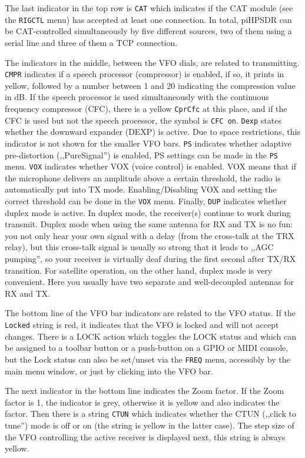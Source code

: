 \documentclass[12pt]{book}
\def\rett#1{\texttt{\color{red}#1}}
\def\bltt#1{\texttt{\color{blue}#1}}
\def\pH{pi\-HPSDR\xspace}
\begin{document}
The last indicator in the top row  is \rett{CAT} which indicates
if the CAT module  (see the \bltt{RIGCTL}  menu) has accepted at least
one connection. In total, \pH can be CAT-controlled simultaneously
by five different sources, two of them using a serial line and
three of them a TCP connection.

The indicators in the middle, between the VFO dials, are related to
transmitting. \rett{CMPR} indicates if a speech processor
(compressor) is enabled, if so, it prints in yellow, followed
by a number between 1 and 20 indicating the compression value in dB.
If the speech processor is used simultaneously with the continuous frequency
compressor (CFC), there is a yellow \rett{CprCfc} at this place, and if
the CFC is used but not the speech processor, the symbol is \rett{CFC on}.
\rett{Dexp} states whether the downward expander (DEXP) is active. Due to space
restrictions, this indicator is not shown for the smaller VFO bars.
\rett{PS} indicates whether adaptive pre-distortion (,,PureSignal'')
is enabled, PS settings can be made in the \bltt{PS} menu.
 \rett{VOX} indicates whether VOX (voice control) is enabled. VOX means
 that if  the microphone delivers an amplitude above a certain threshold,
 the radio is automatically put into TX mode. Enabling/Disabling VOX
 and setting the correct threshold can be done in the \bltt{VOX} menu.
 Finally, \rett{DUP} indicates whether duplex mode is active.
 In duplex mode, the receiver(s) continue to work during transmit. Duplex
 mode when using the same antenna for RX and TX is  no fun: you not only hear
 your own signal with a delay (from the cross-talk at the TRX relay), but
 this cross-talk signal is  usually so strong that it leads to ,,AGC pumping'', so
 your receiver is virtually deaf during the first second after TX/RX
 transition. For satellite operation, on the other hand, duplex  mode
 is very convenient. Here you usually have two separate and well-decoupled
 antennas for RX and TX.

 The bottom line of the VFO bar  indicators are related to the VFO status.
 If the \rett{Locked} string is red, it indicates that the VFO is locked
 and will not accept changes. There is a LOCK action which toggles the
 LOCK status and which can be assigned to a toolbar button or a push-button
 on a GPIO or MIDI console, but the Lock status can also be set/unset
 via the \bltt{FREQ} menu, accessibly by the main menu window, or just by
 clicking into the VFO bar.

The next indicator in the bottom  line indicates the Zoom factor. If the
Zoom factor is 1, the indicator is grey, otherwise it is yellow and
also indicates the factor. Then there is a string \rett{CTUN} which
indicates whether the CTUN (,,click to tune'') mode is off or on (the string
is yellow in the latter case). The step size of the VFO controlling the
active receiver is displayed next, this string is always yellow.
\end{document}

